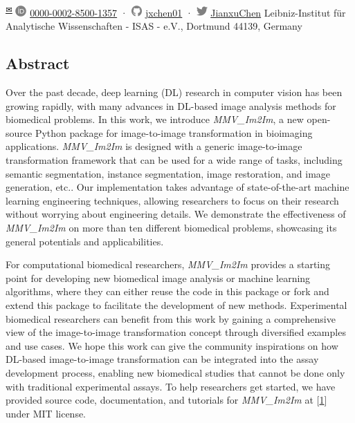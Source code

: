 \begin{itemize}
  \textsuperscript{\protect\hyperlink{correspondence}{✉}}
  \includegraphics[width=0.16667in,height=0.16667in]{images/orcid.svg}
  \href{https://orcid.org/0000-0002-8500-1357}{0000-0002-8500-1357}
  · \includegraphics[width=0.16667in,height=0.16667in]{images/github.svg}
  \href{https://github.com/jxchen01}{jxchen01}
  · \includegraphics[width=0.16667in,height=0.16667in]{images/twitter.svg}
  \href{https://twitter.com/JianxuChen}{JianxuChen}
  Leibniz-Institut für Analytische Wissenschaften - ISAS - e.V., Dortmund 44139, Germany
\end{itemize}

\hypertarget{abstract}{%
\subsection{Abstract}\label{abstract}}

Over the past decade, deep learning (DL) research in computer vision has been growing rapidly, with many advances in DL-based image analysis methods for biomedical problems. In this work, we introduce \emph{MMV\_Im2Im}, a new open-source Python package for image-to-image transformation in bioimaging applications. \emph{MMV\_Im2Im} is designed with a generic image-to-image transformation framework that can be used for a wide range of tasks, including semantic segmentation, instance segmentation, image restoration, and image generation, etc.. Our implementation takes advantage of state-of-the-art machine learning engineering techniques, allowing researchers to focus on their research without worrying about engineering details. We demonstrate the effectiveness of \emph{MMV\_Im2Im} on more than ten different biomedical problems, showcasing its general potentials and applicabilities.

For computational biomedical researchers, \emph{MMV\_Im2Im} provides a starting point for developing new biomedical image analysis or machine learning algorithms, where they can either reuse the code in this package or fork and extend this package to facilitate the development of new methods. Experimental biomedical researchers can benefit from this work by gaining a comprehensive view of the image-to-image transformation concept through diversified examples and use cases. We hope this work can give the community inspirations on how DL-based image-to-image transformation can be integrated into the assay development process, enabling new biomedical studies that cannot be done only with traditional experimental assays. To help researchers get started, we have provided source code, documentation, and tutorials for \emph{MMV\_Im2Im} at {[}\protect\hyperlink{ref-10dtMviwb}{1}{]} under MIT license.

